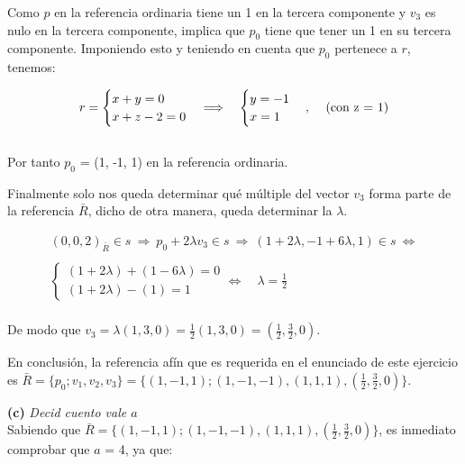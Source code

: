  Como $p$ en la referencia ordinaria tiene un 1 en la tercera componente y $v_3$ es nulo en la tercera componente, implica que $p_0$ tiene que tener un 1 en su tercera componente. Imponiendo esto y teniendo en cuenta que $p_0$ pertenece a $r$, tenemos: 
 
 \begin{gather*}
     r = 
     \begin{cases}
     x + y = 0 \\
     x + z - 2 = 0
     \end{cases}
     \Longrightarrow \quad
     \begin{cases}
     y = -1 \\
     x = 1
     \end{cases}
      \text{, \quad(con z = 1)}
 \end{gather*}
 \\
 
 Por tanto $p_0$ = (1, -1, 1) en la referencia ordinaria. 
 
 Finalmente solo nos queda determinar qué múltiple del vector $v_3$ forma parte de la referencia $\bar{R}$, dicho de otra manera, queda determinar la $\lambda$. 
 
 \begin{gather*}
     (0, 0, 2)_{\bar{R}} \in s \ \Longrightarrow \ p_0 + 2\lambda v_3 \in s \ \Longrightarrow \ (1 + 2\lambda, -1 +6\lambda, 1) \in s \ \Longleftrightarrow \\ 
     \\
     \begin{cases}
     (1 + 2\lambda) + (1 - 6\lambda) = 0 \\
     (1 + 2\lambda) - (1) = 1
     \end{cases} 
     \Longleftrightarrow \quad \lambda = \frac{1}{2}
 \end{gather*}
 \\
 
De modo que $v_3 = \lambda(1,3,0) = \frac{1}{2}(1,3,0) = (\frac{1}{2}, \frac{3}{2}, 0)$. 

En conclusión, la referencia afín que es requerida en el enunciado de este ejercicio es $\bar{R} = \{p_0; v_1, v_2, v_3 \} = \{(1, -1, 1); (1, -1, -1), (1, 1, 1), (\frac{1}{2}, \frac{3}{2}, 0) \}$. \\
 
 \pagebreak
 
 \textbf{(c) } \textit{Decid cuento vale $a$} \\
 
Sabiendo que $\bar{R} = \{(1, -1, 1); (1, -1, -1), (1, 1, 1), (\frac{1}{2}, \frac{3}{2}, 0) \}$, es inmediato comprobar que $a$ = 4, ya que:
 
